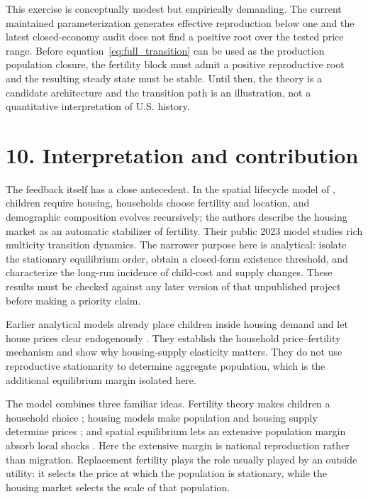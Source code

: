 \documentclass[11pt]{article}
\theoremstyle{definition}
\begin{document}
This exercise is conceptually modest but empirically demanding. The current
maintained parameterization generates effective reproduction below one and the
latest closed-economy audit does not find a positive root over the tested price
range. Before equation~\eqref{eq:full_transition} can be used as the production
population closure, the fertility block must admit a positive reproductive
root and the resulting steady state must be stable. Until then, the theory is a
candidate architecture and the transition path is an illustration, not a
quantitative interpretation of U.S. history.

\section*{10. Interpretation and contribution}

The feedback itself has a close antecedent. In the spatial lifecycle model of
\citet{coeurdacierCombesGobillonOswaldFertility2023}, children require housing,
households choose fertility and location, and demographic composition evolves
recursively; the authors describe the housing market as an automatic stabilizer
of fertility. Their public 2023 model studies rich multicity transition
dynamics. The narrower purpose here is analytical: isolate the stationary
equilibrium order, obtain a closed-form existence threshold, and characterize
the long-run incidence of child-cost and supply changes. These results must be
checked against any later version of that unpublished project before making a
priority claim.

Earlier analytical models already place children inside housing demand and let
house prices clear endogenously \citep{dayFertilityHousing2015,
dayGuestFertilityFemaleWages2016}. They establish the household price--fertility
mechanism and show why housing-supply elasticity matters. They do not use
reproductive stationarity to determine aggregate population, which is the
additional equilibrium margin isolated here.

The model combines three familiar ideas. Fertility theory makes children a
household choice
\citep{barroFertilityChoiceModel1989,sommerFertilityChoiceLife2016}; housing
models make population and housing supply determine prices
\citep{glaeserEconomicImplicationsHousing2018}; and spatial equilibrium lets
an extensive population margin absorb local shocks
\citep{rosenWageBasedIndexes1979,robackWagesRentsQuality1982}. Here the
extensive margin is national reproduction rather than migration. Replacement
fertility plays the role usually played by an outside utility: it selects the
price at which the population is stationary, while the housing market selects
the scale of that population.
\end{document}
